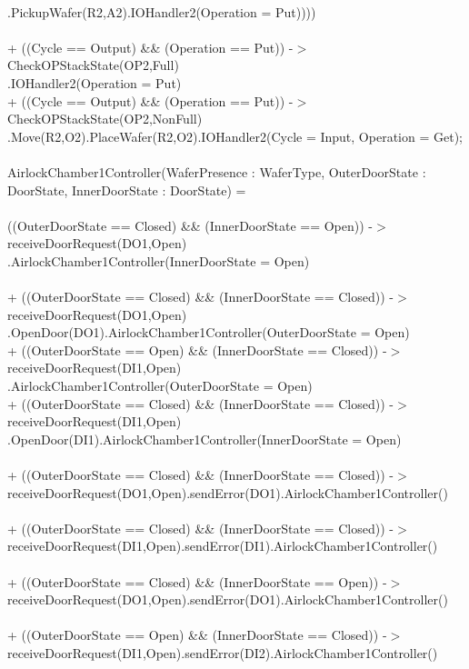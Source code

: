\documentclass[a4paper,12pt]{article}
\begin{document}
	\\.PickupWafer(R2,A2).IOHandler2(Operation = Put))))
	\\
	\\+ ((Cycle == Output) \&\& (Operation == Put)) -$>$ CheckOPStackState(OP2,Full)
	\\.IOHandler2(Operation = Put)
	\\+ ((Cycle == Output) \&\& (Operation == Put)) -$>$ CheckOPStackState(OP2,NonFull)
	\\.Move(R2,O2).PlaceWafer(R2,O2).IOHandler2(Cycle = Input, Operation = Get);
	\\
	\\AirlockChamber1Controller(WaferPresence : WaferType, OuterDoorState : DoorState, InnerDoorState : DoorState) =
	\\
	\\((OuterDoorState == Closed) \&\& (InnerDoorState == Open)) -$>$ receiveDoorRequest(DO1,Open)
	\\.AirlockChamber1Controller(InnerDoorState = Open)
	\\
	\\+ ((OuterDoorState == Closed) \&\& (InnerDoorState == Closed)) -$>$ receiveDoorRequest(DO1,Open)
	\\.OpenDoor(DO1).AirlockChamber1Controller(OuterDoorState = Open)
	\\+ ((OuterDoorState == Open) \&\& (InnerDoorState == Closed)) -$>$ receiveDoorRequest(DI1,Open)
	\\.AirlockChamber1Controller(OuterDoorState = Open)
	\\+ ((OuterDoorState == Closed) \&\& (InnerDoorState == Closed)) -$>$ receiveDoorRequest(DI1,Open)
	\\.OpenDoor(DI1).AirlockChamber1Controller(InnerDoorState = Open)
	\\
	\\+ ((OuterDoorState == Closed) \&\& (InnerDoorState == Closed)) -$>$ receiveDoorRequest(DO1,Open).sendError(DO1).AirlockChamber1Controller()
	\\
	\\+ ((OuterDoorState == Closed) \&\& (InnerDoorState == Closed)) -$>$ receiveDoorRequest(DI1,Open).sendError(DI1).AirlockChamber1Controller()
	\\
	\\+ ((OuterDoorState == Closed) \&\& (InnerDoorState == Open)) -$>$ receiveDoorRequest(DO1,Open).sendError(DO1).AirlockChamber1Controller()
	\\
	\\+ ((OuterDoorState == Open) \&\& (InnerDoorState == Closed)) -$>$ receiveDoorRequest(DI1,Open).sendError(DI2).AirlockChamber1Controller()
\end{document}
